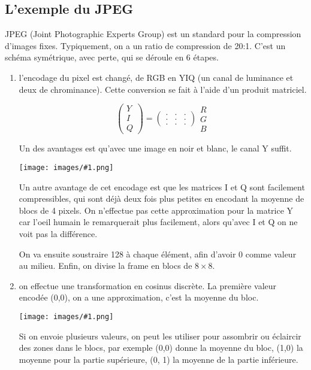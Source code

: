 \documentclass[10pt,a4paper]{report}
\newcommand{\dessin}[1]{\begin{center}\texttt{[image: images/\#1.png]}\end{center}}
\begin{document}
		
		\subsection{L'exemple du JPEG}
		
		JPEG (Joint Photographic Experts Group) est un standard pour la compression d'images fixes. Typiquement, on a un ratio de compression de 20:1. C'est un schéma symétrique, avec perte, qui se déroule en 6 étapes.
				
		\begin{enumerate}
			\item l'encodage du pixel est changé, de RGB en YIQ (un canal de luminance et deux de chrominance). Cette conversion se fait à l'aide d'un produit matriciel.
			
			$$
\begin{pmatrix}
Y \\ 
I \\ 
Q
\end{pmatrix} = \begin{pmatrix}
. & . & . \\ 
. & . & . \\ 
. & . & .
\end{pmatrix} \begin{array}{c}
R \\ 
G \\ 
B
\end{array}$$
			
			Un des avantages est qu'avec une image en noir et blanc, le canal Y suffit.
			
			\dessin{67}
			
			Un autre avantage de cet encodage est que les matrices I et Q sont facilement compressibles, qui sont déjà deux fois plus petites en encodant la moyenne de blocs de 4 pixels. On n'effectue pas cette approximation pour la matrice Y car l'oeil humain le remarquerait plus facilement, alors qu'avec I et Q on ne voit pas la différence.
			
			On va ensuite soustraire 128 à chaque élément, afin d'avoir 0 comme valeur au milieu. Enfin, on divise la frame en blocs de $8 \times 8$.
			
			\item on effectue une transformation en cosinus discrète. La première valeur encodée (0,0), on a une approximation, c'est la moyenne du bloc.
			
			\dessin{68}
			
			Si on envoie plusieurs valeurs, on peut les utiliser pour assombrir ou éclaircir des zones dans le blocs, par exemple (0,0) donne la moyenne du bloc, (1,0) la moyenne pour la partie supérieure, (0, 1) la moyenne de la partie inférieure.
			

\end{enumerate}
\end{document}
